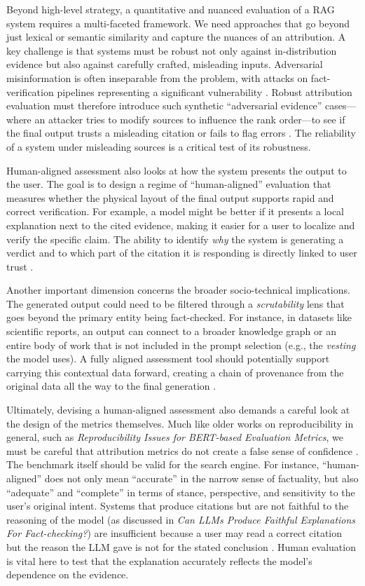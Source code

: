 \documentclass[11pt]{article}
\begin{document}
Beyond high-level strategy, a quantitative and nuanced evaluation of a RAG system requires a multi-faceted framework. We need approaches that go beyond just lexical or semantic similarity and capture the nuances of an attribution. A key challenge is that systems must be robust not only against in-distribution evidence but also against carefully crafted, misleading inputs. Adversarial misinformation is often inseparable from the problem, with attacks on fact-verification pipelines representing a significant vulnerability \cite{ref433}. Robust attribution evaluation must therefore introduce such synthetic ``adversarial evidence'' cases---where an attacker tries to modify sources to influence the rank order---to see if the final output trusts a misleading citation or fails to flag errors \cite{ref434}. The reliability of a system under misleading sources is a critical test of its robustness.

Human-aligned assessment also looks at how the system presents the output to the user. The goal is to design a regime of ``human-aligned'' evaluation that measures whether the physical layout of the final output supports rapid and correct verification. For example, a model might be better if it presents a local explanation next to the cited evidence, making it easier for a user to localize and verify the specific claim. The ability to identify \emph{why} the system is generating a verdict and to which part of the citation it is responding is directly linked to user trust \cite{ref435}.

Another important dimension concerns the broader socio-technical implications. The generated output could need to be filtered through a \emph{scrutability} lens that goes beyond the primary entity being fact-checked. For instance, in datasets like scientific reports, an output can connect to a broader knowledge graph or an entire body of work that is not included in the prompt selection (e.g., the \emph{vesting} the model uses). A fully aligned assessment tool should potentially support carrying this contextual data forward, creating a chain of provenance from the original data all the way to the final generation \cite{ref436}.

Ultimately, devising a human-aligned assessment also demands a careful look at the design of the metrics themselves. Much like older works on reproducibility in general, such as \emph{Reproducibility Issues for BERT-based Evaluation Metrics}, we must be careful that attribution metrics do not create a false sense of confidence \cite{ref437}. The benchmark itself should be valid for the search engine. For instance, ``human-aligned'' does not only mean ``accurate'' in the narrow sense of factuality, but also ``adequate'' and ``complete'' in terms of stance, perspective, and sensitivity to the user's original intent. Systems that produce citations but are not faithful to the reasoning of the model (as discussed in \emph{Can LLMs Produce Faithful Explanations For Fact-checking?}) are insufficient because a user may read a correct citation but the reason the LLM gave is not for the stated conclusion \cite{ref190}. Human evaluation is vital here to test that the explanation accurately reflects the model's dependence on the evidence.
\end{document}
